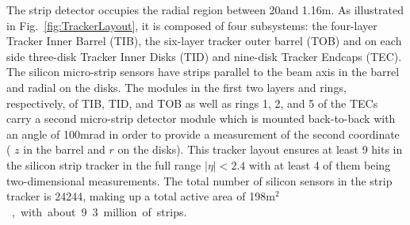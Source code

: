The strip detector occupies the radial region between 20\cm and 1.16\unit{m}. As illustrated in Fig.~\ref{fig:TrackerLayout}, it is composed of four subsystems: the four-layer Tracker Inner Barrel (TIB), the six-layer tracker outer barrel (TOB) and on each side three-disk Tracker Inner Disks (TID) and nine-disk Tracker Endcaps (TEC). The silicon micro-strip sensors have strips parallel to the beam axis in the barrel and radial on the disks. The modules in the first two layers and rings, respectively, of TIB, TID, and TOB as well as rings 1, 2, and 5 of the TECs carry a second micro-strip detector module which is mounted back-to-back with an angle of 100\unit{mrad} in order to provide a measurement of the second coordinate ( $z$ in the barrel and $r$ on the disks). This tracker layout ensures at least 9 hits in the silicon strip tracker in the full range $|\eta| < 2.4$ with at least 4 of them being two-dimensional measurements. The total number of silicon sensors in the strip tracker is 24244, making up a total active area of 198\unit{m$^2$}, with about 9.3 million of strips.

